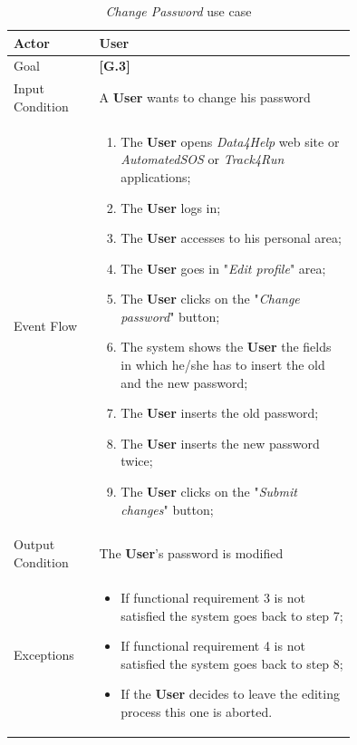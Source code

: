 \begin{center}
\begin{table}[H]
\begin{tabular}{ | l | p{0.75\linewidth} | }
  \hline
    Actor & \textbf{User} \\ \hline
    Goal & \textbf{[G.3]} \\ \hline
    Input Condition & A \textbf{User} wants to change his password\\ \hline
    Event Flow & \begin{minipage}[t]{0.7\textwidth}
      \begin{enumerate}
        \item The \textbf{User} opens \textit{Data4Help} web site or \textit{AutomatedSOS} or \textit{Track4Run} applications;
        \item The \textbf{User} logs in;
        \item The \textbf{User} accesses to his personal area;
        \item The \textbf{User} goes in "\textit{Edit profile}" area;
        \item The \textbf{User} clicks on the "\textit{Change password}" button;
        \item The system shows the \textbf{User} the fields in which he/she has to insert the old and the new password;
        \item The \textbf{User} inserts the old password;
        \item The \textbf{User} inserts the new password twice;
        \item The \textbf{User} clicks on the "\textit{Submit changes}" button;
      \end{enumerate}
    \smallskip
  \end{minipage} \\ \hline
  Output Condition & The \textbf{User}'s password is modified\\ \hline
  Exceptions & \begin{minipage}[t]{0.7\textwidth}
    \begin{itemize}
      \smallskip
      \item If functional requirement 3 is not satisfied the system goes back to step 7;
      \item If functional requirement 4 is not satisfied the system goes back to step 8;
      \item If the \textbf{User} decides to leave the editing process this one is aborted.
    \end{itemize}
    \smallskip
  \end{minipage}  \\ \hline
\end{tabular}
\caption{\textit{Change Password} use case}
\label{table:changePassowrdTable}
\end{table}
\end{center}

